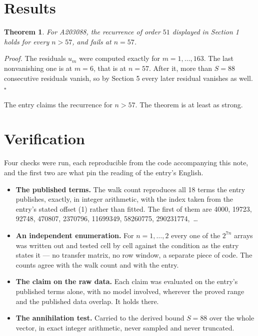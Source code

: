\documentclass[11pt]{article}
\newtheorem{theorem}{Theorem}
\theoremstyle{definition}
\begin{document}
\section{Results}

\begin{theorem} For A203088, the recurrence of order $51$ displayed in Section 1 holds for every $n > 57$, and fails at $n = 57$.\end{theorem}

{\itshape Proof.} The residuals $u_m$ were computed exactly for $m = 1,\dots,163$. The last nonvanishing one is at $m = 6$, that is at $n = 57$. After it, more than $S = 88$ consecutive residuals vanish, so by Section 5 every later residual vanishes as well. $\square$

The entry claims the recurrence for $n > 57$. The theorem is at least as strong.

\section{Verification}

Four checks were run, each reproducible from the code accompanying this note, and the first two are what pin the reading of the entry's English.

\begin{itemize}

\item {\bfseries The published terms.} The walk count reproduces all 18 terms the entry publishes, exactly, in integer arithmetic, with the index taken from the entry's stated offset (1) rather than fitted. The first of them are 4000, 19723, 92748, 470807, 2370796, 11699349, 58260775, 290231774,~\dots

\item {\bfseries An independent enumeration.} For $n = 1,\dots,2$ every one of the $2^{7n}$ arrays was written out and tested cell by cell against the condition as the entry states it --- no transfer matrix, no row window, a separate piece of code. The counts agree with the walk count and with the entry.

\item {\bfseries The claim on the raw data.} Each claim was evaluated on the entry's published terms alone, with no model involved, wherever the proved range and the published data overlap. It holds there.

\item {\bfseries The annihilation test.} Carried to the derived bound $S = 88$ over the whole vector, in exact integer arithmetic, never sampled and never truncated.

\end{itemize}
\end{document}
